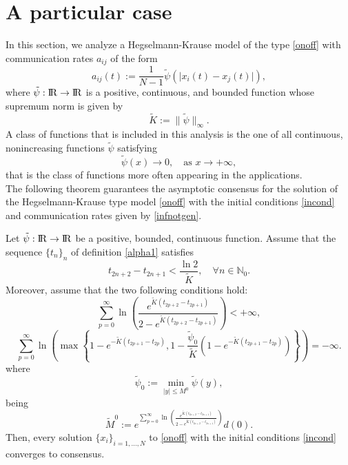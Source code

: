 \documentclass[a4paper,11pt,oneside]{article}
\newcommand{\RR}{{{\rm I} \kern -.15em {\rm R} }}
\begin{document}
	\section{A particular case}
	In this section, we analyze a Hegselmann-Krause model of the type \eqref{onoff} with communication rates $a_{ij}$ of the form
	\begin{equation}\label{infnotgen}
		a_{ij}(t):=\frac{1}{N-1}\tilde{\psi}(\lvert x_{i}(t)-x_{j}(t)\rvert),
	\end{equation}
where $\tilde{\psi}:\RR\rightarrow\RR$ is a positive, continuous, and bounded function whose supremum norm is given by
$$\tilde{K}:=\lVert\tilde{\psi}\rVert_{\infty}.$$
A class of functions that is included in this analysis is the one of all continuous, nonincreasing functions $\tilde{\psi}$ satisfying
$$\tilde{\psi}(x)\to 0,\quad \text{as }x\to +\infty,$$ 
that is the class of functions more often appearing in the applications.
\\The following theorem guarantees the asymptotic consensus for the solution of the Hegselmann-Krause type model \eqref{onoff} with the initial conditions \eqref{incond} and communication rates given by \eqref{infnotgen}. 
\begin{thm}\label{consnotgen}
	Let $\tilde{\psi}:\RR\rightarrow\RR$ be a positive, bounded, continuous function. Assume that the sequence $\{t_{n}\}_{n}$ of definition \eqref{alpha1} satisfies \begin{equation}\label{tntilde}
		t_{2n+2}-t_{2n+1}<\frac{\ln 2}{\tilde K},\quad \forall n\in \mathbb{N}_0.
	\end{equation}
Moreover, assume that the two following conditions hold:
	\begin{equation}\label{sum1tilde}
		\sum_{p=0}^{\infty}\ln\left(\frac{e^{\tilde K(t_{2p+2}-t_{2p+1})}}{2-e^{\tilde K(t_{2p+2}-t_{2p+1})}}\right)<+\infty,
	\end{equation}
	\begin{equation}\label{sum2nob}
		\sum_{p=0}^{\infty}\ln\left(\max\left\{1-e^{-\tilde K(t_{2p+1}-t_{2p})},1-\frac{\tilde{\psi}_{0}}{\tilde K}(1-e^{-\tilde K(t_{2p+1}-t_{2p})})\right\}\right)=-\infty.
	\end{equation} 
where \begin{equation}\label{tildepsi}
	\tilde{\psi}_{0}:=\min_{\lvert y\rvert\leq M^{0}}\tilde\psi(y),
\end{equation}
being
\begin{equation}\label{boundunif}
	\tilde M^{0}:=e^{\sum_{p=0}^{\infty}\ln \left(\frac{e^{\tilde K(t_{2n+2}-t_{2n+1})}}{2-e^{\tilde K(t_{2n+2}-t_{2n+1})}}\right)}d(0).
\end{equation}
Then, every solution $\{x_{i}\}_{i=1,\dots,N}$ to \eqref{onoff} with the initial conditions \eqref{incond} converges to consensus.
\end{thm}
\end{document}
